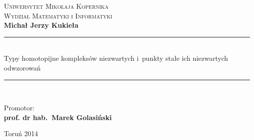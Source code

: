 \begin{titlepage}
\begin{center}

{\Large\scshape Uniwersytet Mikołaja Kopernika}\\[0.5cm]
{\large\scshape Wydział Matematyki i Informatyki}\\[2.5cm]

{\Large\bfseries Michał Jerzy Kukieła\\[1.5cm]}

\rule{\linewidth}{0.3mm}\\[0.5cm]
{ \huge\sffamily Typy homotopijne kompleksów niezwartych i~punkty stałe ich niezwartych odwzorowań \\[0.7cm] }
\rule{\linewidth}{0.3mm}\\[2cm]

\normalfont
\hfill 
\begin{minipage}{0.5\textwidth}
\begin{flushleft} \large
Promotor: \\
\textbf{prof. dr hab.~Marek Golasiński}
\end{flushleft}
\end{minipage}

\vfill

{\large Toruń 2014}

\end{center}
\end{titlepage}
